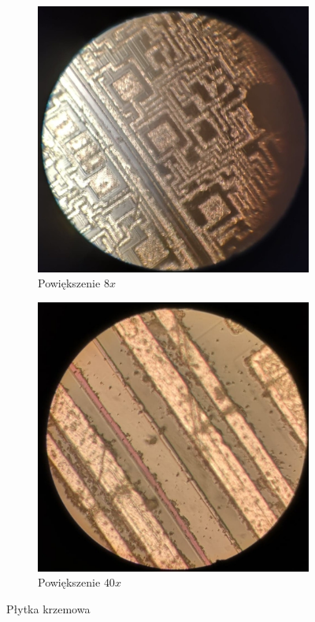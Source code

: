 \begin{figure}[H]
    \begin{subfigure}{.5\textwidth}
        \centering
        \includegraphics[width=.8\linewidth]{img/krzemowa8.jpg}  
        \caption{Powiększenie $8x$}
    \end{subfigure}
    \begin{subfigure}{.5\textwidth}
        \centering
        \includegraphics[width=.8\linewidth]{img/krzemowa40.jpg}  
        \caption{Powiększenie $40x$}
    \end{subfigure}
    \caption{Płytka krzemowa}
\end{figure}

